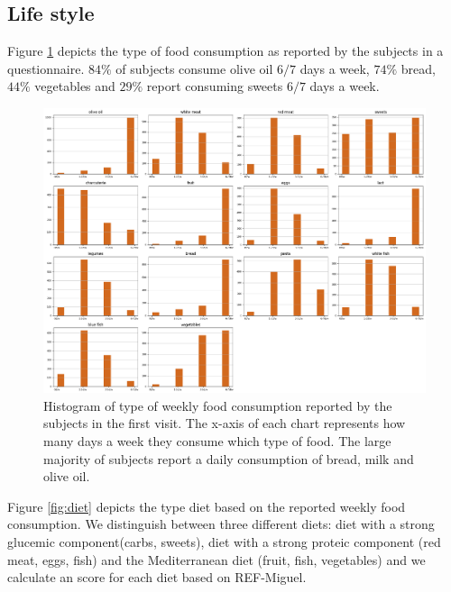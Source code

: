 \documentclass[11pt]{article}
\theoremstyle{definition}
\theoremstyle{remark}
\begin{document}
\subsection{Life style}
\label{ssse:life}
Figure \ref{fig:food} depicts the type of food consumption as reported by the subjects in a questionnaire. $84\%$ of subjects consume olive oil $6/7$ days a week, $74\%$ bread, $44\%$ vegetables and $29\%$ report consuming sweets $6/7$ days a week.

\begin{figure}[H]
        \centering
        \includegraphics[keepaspectratio, width=\linewidth]{figures/Fig_food}
        \caption{Histogram of type of weekly food consumption reported by the subjects in the first visit. The x-axis of each chart represents how many days a week they consume which type of food. The large majority of subjects report a daily consumption of bread, milk and olive oil.}
        \label{fig:food}
\end{figure}

Figure \ref{fig:diet} depicts the type diet based on the reported weekly food consumption. We distinguish between three different diets: diet with a strong glucemic component(carbs, sweets), diet with a strong proteic component (red meat, eggs, fish) and the Mediterranean diet (fruit, fish, vegetables) and we calculate an score for each diet based on REF-Miguel.
\end{document}
